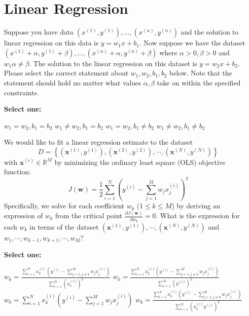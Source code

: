 \documentclass[11pt,addpoints,answers]{exam}
\numberwithin{equation}{section} %
\numberwithin{figure}{section} %
\numberwithin{table}{section} %
\newcommand{\wv}{\mathbf{w}}
\newcommand{\xv}{\mathbf{x}}
\begin{document}
\section{Linear Regression}
\begin{questions}

    \question[4] Suppose you have data ${(x^{(1)}, y^{(1)}), \ldots, (x^{(n)}, y^{(n)})}$ and the solution to linear regression on this data is $y = w_1 x + b_1$. Now suppose we have the dataset \\
    ${(x^{(1)} + \alpha, y^{(1)} + \beta), \ldots, (x^{(n)} + \alpha, y^{(n)} + \beta)}$ where $\alpha > 0, \beta > 0$ and $w_1 \alpha \neq \beta$. The solution to the linear regression on this dataset is $y = w_2 x + b_2$. Please select the correct statement about $w_1, w_2, b_1, b_2$ below. Note that the statement should hold no matter what values $\alpha, \beta$ take on within the specified constraints.
    
    \textbf{Select one:}
    \begin{checkboxes}
        \choice $w_1 = w_2, b_1 = b_2$
        \choice $w_1 \neq w_2, b_1 = b_2$
        \choice $w_1 = w_2, b_1 \neq b_2$
        \choice $w_1 \neq w_2, b_1 \neq b_2$
    \end{checkboxes}
    

    \question[4] We would like to fit a linear regression estimate to the dataset 
    $$
    D = \left\{\left(\xv^{(1)},y^{(1)}\right), \left(\xv^{(2)},y^{(2)}\right),\cdots, \left(\xv^{(N)},y^{(N)}\right)\right\}
    $$ with $\xv^{(i)} \in \mathbb{R}^M$ by minimizing the ordinary least square (OLS) objective function:
    $$
    J(\wv) = \frac{1}{2}\sum_{i=1}^N\left(y^{(i)} - \sum_{j=1}^M w_j x_j^{(i)}\right)^2
    $$
    Specifically, we solve for each coefficient $w_k$ ($1\leq k\leq M$) by deriving an expression of $w_k$ from the critical point $\frac{\partial J(\wv)}{\partial w_k} = 0$. What is the expression for each $w_k$ in terms of the dataset 
    $(\xv^{(1)},y^{(1)}), \cdots, (\xv^{(N)},y^{(N)})$ and $w_1,\cdots,w_{k-1},w_{k+1},\cdots,w_M$?

    \textbf{Select one:}
    \begin{checkboxes}
        \choice $w_k = \frac{\sum_{i=1}^N x_k^{(i)}(y^{(i)}-\sum_{j=1,j\neq k}^M w_j x_j^{(i)})}{\sum_{i=1}^N (x_k^{(i)})^2}$
        \choice $w_k = \frac{\sum_{i=1}^N x_k^{(i)}(y^{(i)}-\sum_{j=1,j\neq k}^M w_j x_j^{(i)})}{\sum_{i=1}^N (y^{(i)})^2}$
        \choice $w_k = \sum_{i=1}^N x_k^{(i)}(y^{(i)}-\sum_{j=1}^M w_j x_j^{(i)})$
        \choice $w_k = \frac{\sum_{i=1}^N x_k^{(i)}(y^{(i)}-\sum_{j=1,j\neq k}^M w_j x_j^{(i)})}{\sum_{i=1}^N (x_k^{(i)} y^{(i)})^2}$
    \end{checkboxes}


\end{questions}
\end{document}
